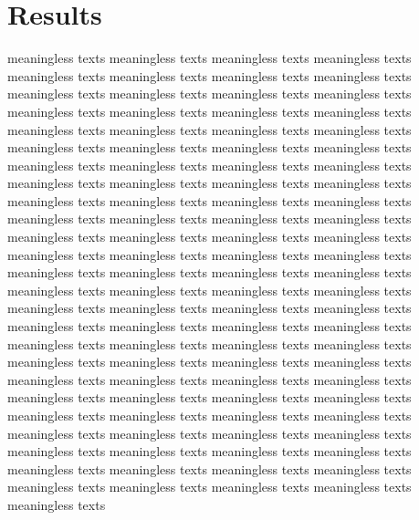 \documentclass[12pt, twoside, notitlepage, twocolumn]{article}
\begin{document}
    \section{Results}
    meaningless texts meaningless texts meaningless texts meaningless texts meaningless texts 
    meaningless texts meaningless texts meaningless texts meaningless texts meaningless texts 
    meaningless texts meaningless texts meaningless texts meaningless texts meaningless texts 
    meaningless texts meaningless texts meaningless texts meaningless texts meaningless texts 
    meaningless texts meaningless texts meaningless texts meaningless texts meaningless texts 
    meaningless texts meaningless texts meaningless texts meaningless texts meaningless texts 
    meaningless texts meaningless texts meaningless texts meaningless texts meaningless texts 
    meaningless texts meaningless texts meaningless texts meaningless texts meaningless texts 
    meaningless texts meaningless texts meaningless texts meaningless texts meaningless texts 
    meaningless texts meaningless texts meaningless texts meaningless texts meaningless texts 
    meaningless texts meaningless texts meaningless texts meaningless texts meaningless texts 
    meaningless texts meaningless texts meaningless texts meaningless texts meaningless texts 
    meaningless texts meaningless texts meaningless texts meaningless texts meaningless texts 
    meaningless texts meaningless texts meaningless texts meaningless texts meaningless texts 
    meaningless texts meaningless texts 
    \setlength{\parindent}{0pt}
    meaningless texts meaningless texts meaningless texts 
    meaningless texts meaningless texts meaningless texts meaningless texts meaningless texts 
    meaningless texts meaningless texts meaningless texts meaningless texts meaningless texts 
    meaningless texts meaningless texts meaningless texts meaningless texts meaningless texts 
    meaningless texts meaningless texts meaningless texts meaningless texts meaningless texts 
    meaningless texts meaningless texts meaningless texts meaningless texts meaningless texts 
    meaningless texts 
    
\end{document}
